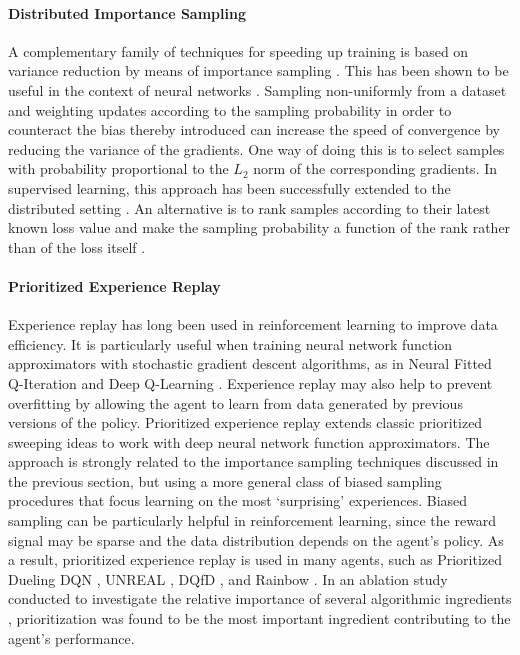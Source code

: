 \documentclass{article} %
\begin{document}
\paragraph{Distributed Importance Sampling}

A complementary family of techniques for speeding up training is based on variance reduction by means of importance sampling \citep[cf.][]{hastings1970monte}. This has been shown to be useful in the context of neural networks \citep{Hinton2007-vs}. Sampling non-uniformly from a dataset and weighting updates according to the sampling probability in order to counteract the bias thereby introduced can increase the speed of convergence by reducing the variance of the gradients. One way of doing this is to select samples with probability proportional to the $L_2$ norm of the corresponding gradients. In supervised learning, this approach has been successfully extended to the distributed setting \citep{alain2015variance}. An alternative is to rank samples according to their latest known loss value and make the sampling probability a function of the rank rather than of the loss itself \citep{loshchilov2015online}.

\paragraph{Prioritized Experience Replay}

Experience replay \citep{experience-replay} has long been used in reinforcement learning to improve data efficiency. It is particularly useful when training neural network function approximators with stochastic gradient descent algorithms, as in Neural Fitted Q-Iteration \citep{nfq} and Deep Q-Learning \citep{dqn}. Experience replay may also help to prevent overfitting by allowing the agent to learn from data generated by previous versions of the policy. Prioritized experience replay \citep{prioritized-replay} extends classic prioritized sweeping ideas \citep{prioritized-sweeping} to work with deep neural network function approximators. The approach is strongly related to the importance sampling techniques discussed in the previous section, but using a more general class of biased sampling procedures that focus learning on the most `surprising' experiences. Biased sampling can be particularly helpful in reinforcement learning, since the reward signal may be sparse and the data distribution depends on the agent's policy. As a result, prioritized experience replay is used in many agents, such as Prioritized Dueling DQN \citep{dueling}, UNREAL \citep{unreal}, DQfD \citep{dqfd}, and Rainbow \citep{rainbow}. In an ablation study conducted to investigate the relative importance of several algorithmic ingredients \citep{rainbow}, prioritization was found to be the most important ingredient contributing to the agent's performance. 
\end{document}
